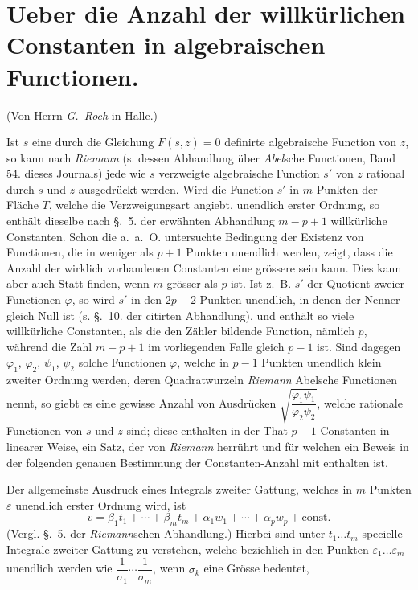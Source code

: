 \documentclass{article}
\begin{document}
\section*{Ueber die Anzahl der willkürlichen Constanten in algebraischen Functionen.}

(Von Herrn \emph{G.~Roch} in Halle.)

Ist $s$ eine durch die Gleichung $F(s, z) = 0$ definirte algebraische Function von $z$, so kann nach \emph{Riemann} (s. dessen Abhandlung über \emph{Abel}sche Functionen, Band 54. dieses Journals) jede wie $s$ verzweigte algebraische Function $s'$ von $z$ rational durch $s$ und $z$ ausgedrückt werden. Wird die Function $s'$ in $m$ Punkten der Fläche $T$, welche die Verzweigungsart angiebt, unendlich erster Ordnung, so enthält dieselbe nach §.~5. der erwähnten Abhandlung $m-p+1$ willkürliche Constanten. Schon die a.~a.~O. untersuchte Bedingung der Existenz von Functionen, die in weniger als $p+1$ Punkten unendlich werden, zeigt, dass die Anzahl der wirklich vorhandenen Constanten eine grössere sein kann. Dies kann aber auch Statt finden, wenn $m$ grösser als $p$ ist. Ist z.~B. $s'$ der Quotient zweier Functionen $\varphi$, so wird $s'$ in den $2p-2$ Punkten unendlich, in denen der Nenner gleich Null ist (s. §.~10. der citirten Abhandlung), und enthält so viele willkürliche Constanten, als die den Zähler bildende Function, nämlich $p$, während die Zahl $m-p+1$ im vorliegenden Falle gleich $p-1$ ist. Sind dagegen $\varphi_{1}$, $\varphi_{2}$, $\psi_{1}$, $\psi_{2}$ solche Functionen $\varphi$, welche in $p-1$ Punkten unendlich klein zweiter Ordnung werden, deren Quadratwurzeln \emph{Riemann} Abelsche Functionen nennt, so giebt es eine gewisse Anzahl von Ausdrücken $\sqrt{\dfrac{\varphi_{1}\psi_{1}}{\varphi_{2}\psi_{2}}}$, welche rationale Functionen von $s$ und $z$ sind; diese enthalten in der That $p-1$ Constanten in linearer Weise, ein Satz, der von \emph{Riemann} herrührt und für welchen ein Beweis in der folgenden genauen Bestimmung der Constanten-Anzahl mit enthalten ist.

Der allgemeinste Ausdruck eines Integrals zweiter Gattung, welches in $m$ Punkten $\varepsilon$ unendlich erster Ordnung wird, ist
\[ v = \beta_{1} t_{1} + \cdots + \beta_{m} t_{m} + \alpha_{1} w_{1} + \cdots + \alpha_{p} w_{p} + \text{const.} \]
(Vergl. §.~5. der \emph{Riemann}schen Abhandlung.) Hierbei sind unter $t_{1} \ldots t_{m}$ specielle Integrale zweiter Gattung zu verstehen, welche beziehlich in den Punkten $\varepsilon_{1} \ldots \varepsilon_{m}$ unendlich werden wie $\dfrac{1}{\sigma_{1}} \cdots \dfrac{1}{\sigma_{m}}$, wenn $\sigma_{k}$ eine Grösse bedeutet,
\end{document}
